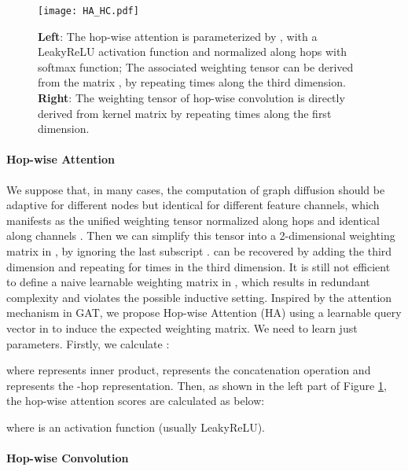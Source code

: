 \documentclass{article}
\begin{document}
\begin{figure}[tbp]
\centering
\texttt{[image: HA\_HC.pdf]}
\caption{\textbf{Left}: The hop-wise attention is parameterized by , with a LeakyReLU activation function  and normalized along hops with softmax function; The associated weighting tensor  can be derived from the  matrix , by repeating  times along the third dimension. \textbf{Right}: The weighting tensor of hop-wise convolution  is directly derived from  kernel matrix  by repeating  times along the first dimension.}

\label{fig: HA and HC}

\end{figure}

\paragraph{Hop-wise Attention}
We suppose that, in many cases, the computation of graph diffusion should be adaptive for different nodes but identical for different feature channels, which manifests as the unified weighting tensor normalized along hops 
and identical along channels . Then we can simplify this tensor into a 2-dimensional weighting matrix  in , by ignoring the last subscript .  can be recovered by adding the third dimension and repeating  for  times in the third dimension. It is still not efficient to define a naive learnable weighting matrix in , which results in redundant complexity and violates the possible inductive setting. Inspired by the attention mechanism in GAT, we propose Hop-wise Attention (HA) using a learnable query vector  in  to induce the expected weighting matrix. We need to learn just  parameters. Firstly, we calculate :

where  represents inner product,  represents the concatenation operation and  represents the -hop representation.
Then, as shown in the left part of Figure \ref{fig: HA and HC}, the hop-wise attention scores are calculated as below:



where  is an activation function (usually LeakyReLU).

\paragraph{Hop-wise Convolution}
\end{document}
